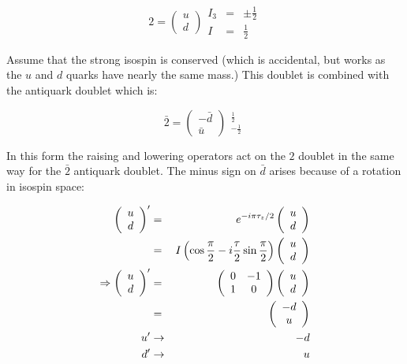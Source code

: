 \[
  2 = 
  \left(
    \begin{array}{c}
    u \\
    d
    \end{array}
  \right)
    \begin{array}{ccc}
    I_3 & = & \pm \frac{1}{2} \\
    I & = & \frac{1}{2}
    \end{array}
\]

Assume that the strong isospin is conserved (which is accidental, but works as the $u$ and $d$ quarks have nearly the same mass.)  This doublet is combined with the antiquark doublet which is:

\[
  \bar{2} = 
  \left(
    \begin{array}{c}
    -\bar{d} \\
    \bar{u}
    \end{array}
  \right)
    \begin{array}{c}
    ^{ \frac{1}{2}} \\
    _{-\frac{1}{2}}
    \end{array}
\]

In this form the raising and lowering operators act on the $2$ doublet in the same way for the $\bar{2}$ antiquark doublet.  The minus sign on $\bar{d}$ arises because of a rotation in isospin space:

\begin{eqnarray*}
  \left(
    \begin{array}{c}
    u \\
    d
    \end{array}
  \right)'
  & = &
  e^{-i \pi \tau_z/2}
  \left(
    \begin{array}{c}
    u \\
    d
    \end{array}
  \right)
  \\
  & = &
  I\left( \cos \frac{\pi}{2} -i\frac{\tau}{2} \sin \frac{\pi}{2} \right)
  \left(
    \begin{array}{c}
    u \\
    d
    \end{array}
  \right)
  \\
  \Rightarrow
  \left(
    \begin{array}{c}
    u \\
    d
    \end{array}
  \right)'
  & = &
  \left(
    \begin{array}{cc}
    0 & -1 \\
    1 & 0
    \end{array}
  \right)
  \left(
    \begin{array}{c}
    u \\
    d
    \end{array}
  \right)
  \\
  & = &
  \left(
    \begin{array}{c}
    -d \\
    u
    \end{array}
  \right)
  \\
  u' & \to & -d \\
  d' & \to & u
\end{eqnarray*}

